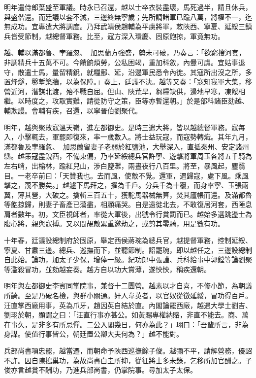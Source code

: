 \begin{pinyinscope}
明年遣侍郎葉盛至軍議。時永已召還，越以士卒衣裝盡壞，馬死過半，請且休兵，與盛偕還。而廷議以套不滅，三邊終無寧歲；先所調諸軍已踰八萬，將權不一，迄無成功。宜專遣大將調度。乃拜武靖侯趙輔為平虜將軍，敕陜西、寧夏、延綏三鎮兵皆受節制，越總督軍務。比至，寇方深入環慶、固原飽掠，軍竟無功。

越、輔以滿都魯、孛羅忽、加思蘭方強盛，勢未可破，乃奏言：「欲窮搜河套，非調精兵十五萬不可。今饋餉煩勞，公私困竭，重加科斂，內釁可虞。宜姑事退守，散遣士馬，量留精銳，就糧鄜、延，沿邊軍民悉令內徙。其寇所出沒之所，多置烽燧，鑿塹築牆，以為保障。」奏上，廷議不決。越等又奏：「寇知我軍大集，移營近河，潛謀北渡，殆不戰自屈。但山、陜荒旱，芻糧缺供，邊地早寒，凍餒相繼。以時度之，攻取實難，請從防守之策，臣等亦暫還朝。」於是部科諸臣劾越、輔欺謾。會輔有疾，召還，以寧晉伯劉聚代。

明年，越與聚敗寇溫天嶺，進左都御史。是時三遣大將，皆以越總督軍務。寇每入，小擊輒去，軍罷即復來，率一歲數入。將士益玩寇，而寇勢轉熾。其年九月，滿都魯及孛羅忽、加思蘭留妻子老弱於紅鹽池，大舉深入，直抵秦州、安定諸州縣。越策寇盡銳西，不備東偏，乃率延綏總兵官許寧、遊擊將軍周玉各將五千騎為左右哨，出榆林，踰紅兒山，涉白鹽灘，兩晝夜行八百里。將至，暴風起，塵翳目。一老卒前曰：「天贊我也。去而風，使敵不覺。還軍，遇歸寇，處下風。乘風擊之，蔑不勝矣。」越遽下馬拜之，擢為千戶。分兵千為十覆，而身率寧、玉張兩翼，薄其營，大破之。擒斬三百五十，獲駝馬器械無算，焚其廬帳而還。及滿都魯等飽掠歸，則妻子畜產已蕩盡，相顧痛哭。自是遠徙北去，不敢復居河套，西陲息肩者數年。初，文臣視師者，率從大軍後，出號令行賞罰而已。越始多選跳盪士為腹心將，親與寇搏。又以間覘敵累重邀劫之，或剪其零騎，用是數有功。

十年春，廷議設總制府於固原，舉定西侯蔣琬為總兵官，越提督軍務，控制延綏、寧夏、甘肅三邊。總兵、巡撫而下，並聽節制。詔罷琬，即以越任之，三邊設總制自此始。論功，加太子少保，增俸一級。紀功郎中張謹、兵科給事中郭鏜等論劉聚等濫殺冒功，並劾越妄奏。越方自以功大賞薄，遂怏怏，稱疾還朝。

明年與左都御史李賓同掌院事，兼督十二團營。越素以才自喜，不修小節，為朝議所齮。至是乃破名檢，與群小關通。奸人韋英者，以官奴從徵延綏，冒功得百戶。汪直掌西廠用事，英為爪牙，趙因英自結於直。內閣論罷西廠，越遇大學士劉吉、劉珝於朝，顯謂之曰：「汪直行事亦甚公。如黃賜專權納賂，非直不能去。商、萬在事久，是非多有所忌憚。二公入閣幾日，何亦為此？」珝曰：「吾輩所言，非為身謀。使值行事皆公，朝廷置公卿大夫何為？」越不能對。

兵部尚書項忠罷，越當遷，而朝命予陜西巡撫餘子俊。越彌不平，請解營務，優詔不許。因自陳搗巢功，為故尚書白圭所抑，從征將士多未錄，乞移所加官酬之。子俊亦言越賞不酬功，乃進兵部尚書，仍掌院事。尋加太子太保。


\end{pinyinscope}
